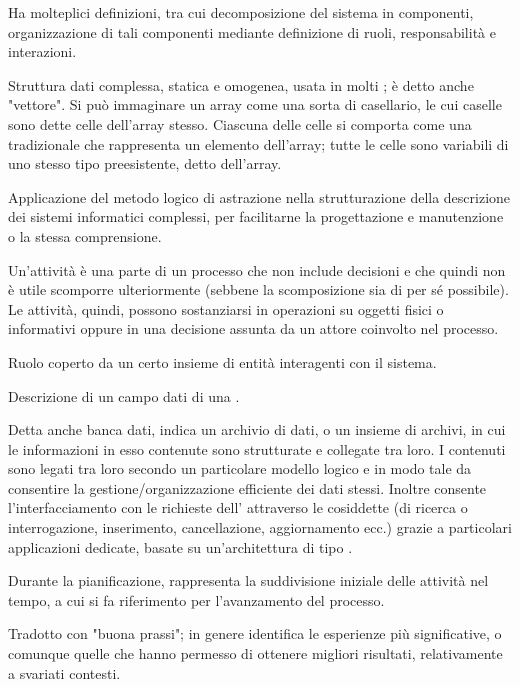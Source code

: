 {Ha molteplici definizioni, tra cui decomposizione del sistema in componenti, organizzazione di tali componenti mediante definizione di ruoli, responsabilità e interazioni. }
 
{Struttura dati complessa, statica e omogenea, usata in molti ; è detto anche "vettore".
 Si può immaginare un array come una sorta di casellario, le cui caselle sono dette celle dell'array stesso. Ciascuna delle celle si comporta come una  tradizionale che rappresenta un elemento dell'array; tutte le celle sono variabili di uno stesso tipo preesistente, detto  dell'array.}

{Applicazione del metodo logico di astrazione nella strutturazione della descrizione dei sistemi informatici complessi, per facilitarne la progettazione e manutenzione o la stessa comprensione.}

{Un'attività è una parte di un processo che non include decisioni e che quindi non è utile scomporre ulteriormente (sebbene la scomposizione sia di per sé possibile). Le attività, quindi, possono sostanziarsi in operazioni su oggetti fisici o informativi oppure in una decisione assunta da un attore coinvolto nel processo.}

{Ruolo coperto da un certo insieme di entità interagenti con il sistema.}

{Descrizione di un campo dati di una .}




{Detta anche banca dati, indica un archivio di dati, o un insieme di archivi, in cui le informazioni in esso contenute sono strutturate e collegate tra loro. I contenuti sono legati tra loro secondo un particolare modello logico e in modo tale da consentire la gestione/organizzazione efficiente dei dati stessi. Inoltre consente l'interfacciamento con le richieste dell' attraverso le cosiddette  (di ricerca o interrogazione, inserimento, cancellazione, aggiornamento ecc.) grazie a particolari applicazioni  dedicate, basate su un'architettura di tipo .}

{Durante la pianificazione, rappresenta la suddivisione iniziale delle attività nel tempo, a cui si fa riferimento per l'avanzamento del processo.}

{Tradotto con "buona prassi"; in genere identifica le esperienze più significative, o comunque quelle che hanno permesso di ottenere migliori risultati, relativamente a svariati contesti.}

